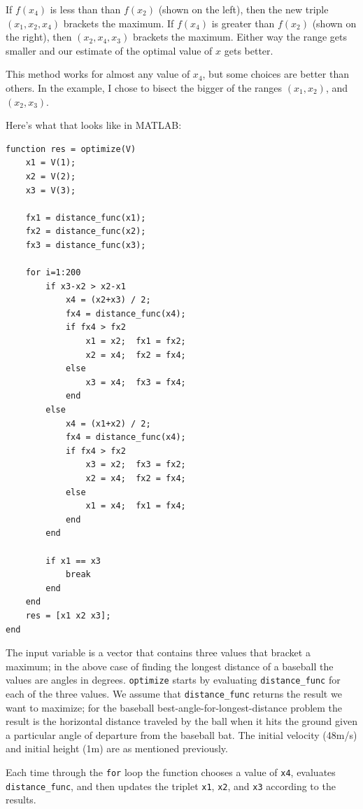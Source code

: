 \documentclass[
]{book}
\begin{document}
If $f(x_4)$ is less than than $f(x_2)$ (shown on the left), then the
new triple $(x_1, x_2, x_4)$ brackets the maximum.  If $f(x_4)$ is
greater than $f(x_2)$ (shown on the right), then $(x_2, x_4, x_3)$
brackets the maximum.  Either way the range gets smaller and our
estimate of the optimal value of $x$ gets better.

This method works for almost any value of $x_4$, but some choices
are better than others.  In the example, I chose to bisect the
bigger of the ranges $(x_1, x_2)$, and $(x_2, x_3)$.

Here's what that looks like in MATLAB:

\begin{verbatim}
function res = optimize(V)
    x1 = V(1);
    x2 = V(2);
    x3 = V(3);

    fx1 = distance_func(x1);
    fx2 = distance_func(x2);
    fx3 = distance_func(x3);

    for i=1:200
        if x3-x2 > x2-x1
            x4 = (x2+x3) / 2;
            fx4 = distance_func(x4);
            if fx4 > fx2
                x1 = x2;  fx1 = fx2;
                x2 = x4;  fx2 = fx4;
            else
                x3 = x4;  fx3 = fx4;
            end
        else
            x4 = (x1+x2) / 2;
            fx4 = distance_func(x4);
            if fx4 > fx2
                x3 = x2;  fx3 = fx2;
                x2 = x4;  fx2 = fx4;
            else
                x1 = x4;  fx1 = fx4;
            end
        end

        if x1 == x3
            break
        end
    end
    res = [x1 x2 x3];
end
\end{verbatim}

The input variable is a vector that contains three values that bracket
a maximum; in the above case of finding the longest distance of a baseball 
the values are angles in degrees.  {\tt optimize}
starts by evaluating {\tt distance\_func} for each of the three values.
We assume that {\tt distance\_func} returns the result we want to
maximize; for the baseball best-angle-for-longest-distance problem
the result is the horizontal distance traveled by the
ball when it hits the ground given a particular angle of departure from
the baseball bat.  The initial velocity (48m/s) and initial height (1m) 
are as mentioned previously.

Each time through the {\tt for} loop the function chooses a value
of {\tt x4}, evaluates {\tt distance\_func}, and then updates the
triplet {\tt x1}, {\tt x2}, and {\tt x3} according to the results.
\end{document}
